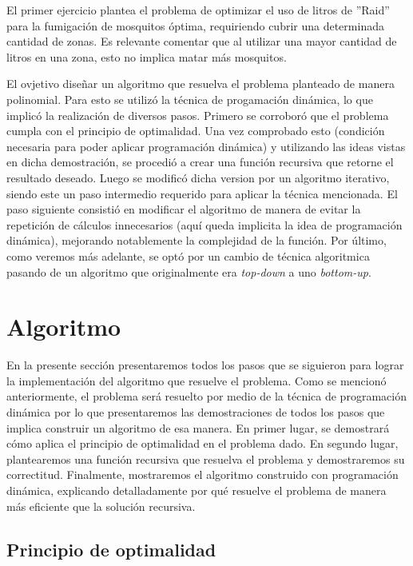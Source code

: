 \documentclass[a4paper,11pt] {article}
\begin{document}
El primer ejercicio plantea el problema de optimizar el uso de litros de ''Raid'' para la fumigación de mosquitos óptima, requiriendo cubrir una determinada cantidad de zonas. Es relevante comentar que al utilizar una mayor cantidad de litros en una zona, esto no implica matar más mosquitos.

El ovjetivo diseñar un algoritmo que resuelva el problema planteado de manera polinomial. Para esto se utiliz\'o la t\'ecnica de progamaci\'on din\'amica, lo que implic\'o la realizaci\'on de diversos pasos. Primero se corrobor\'o que el problema cumpla con el principio de optimalidad. Una vez comprobado esto (condici\'on necesaria para poder aplicar programaci\'on din\'amica) y utilizando las ideas vistas en dicha demostraci\'on, se procedi\'o a crear una funci\'on recursiva que retorne el resultado deseado. Luego se modific\'o dicha version por un algoritmo iterativo, siendo este un paso intermedio requerido para aplicar la t\'ecnica mencionada. El paso siguiente consisti\'o en modificar el algoritmo de manera de evitar la repetici\'on de c\'alculos innecesarios (aqu\'i queda implicita la idea de programaci\'on din\'amica), mejorando notablemente la complejidad de la funci\'on. Por \'ultimo, como veremos m\'as adelante, se opt\'o por un cambio de t\'ecnica algoritmica pasando de un algoritmo que originalmente era \textit{top-down} a uno \textit{bottom-up}.

\section*{Algoritmo}

En la presente secci\'on presentaremos todos los pasos que se siguieron para lograr la implementaci\'on del algoritmo que resuelve el problema. Como se mencion\'o anteriormente, el problema ser\'a resuelto por medio de la t\'ecnica de programaci\'on din\'amica por lo que presentaremos las demostraciones de todos los pasos que implica construir un algoritmo de esa manera. En primer lugar, se demostrar\'a c\'omo aplica el principio de optimalidad en el problema dado. En segundo lugar, plantearemos una funci\'on recursiva que resuelva el problema y demostraremos su correctitud. Finalmente, mostraremos el algoritmo construido con programaci\'on din\'amica, explicando detalladamente por qu\'e resuelve el problema de manera m\'as eficiente que la soluci\'on recursiva.

\subsection*{Principio de optimalidad}
\end{document}
